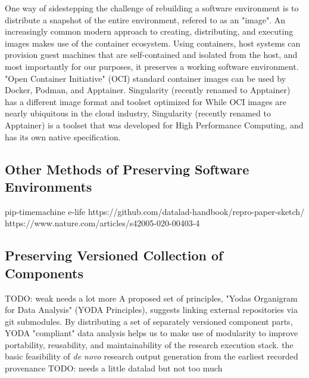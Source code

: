 One way of sidestepping the challenge of rebuilding a software environment is to distribute a snapshot of the entire environment, refered to as an "image".
An increasingly common modern approach to creating, distributing, and executing images makes use of the container ecosystem.
Using containers, host systems can provision guest machines that are self-contained and isolated from the host, and most importantly for our purposes, it preserves a working software environment.
"Open Container Initiative" (OCI) standard container images can be used by Docker, Podman, and Apptainer.
Singularity (recently renamed to Apptainer) has a different image format and toolset optimized for While OCI images are nearly ubiquitous in the cloud industry, Singularity (recently renamed to Apptainer) is a toolset that was developed for High Performance Computing, and has its own native specification.

\subsection{Other Methods of Preserving Software Environments}

pip-timemachine
e-life
https://github.com/datalad-handbook/repro-paper-sketch/
https://www.nature.com/articles/s42005-020-00403-4


\subsection{Preserving Versioned Collection of Components}

TODO: weak needs a lot more
A proposed set of principles, "Yodas Organigram for Data Analysis" (YODA Principles), suggests linking external repositories via git submodules. \cite{TODO YODA}
By distributing a set of separately versioned component parts, YODA "compliant" data analysis helps us to make use of modularity to improve portability, reusability, and maintainability of the research execution stack.
the basic feasibility of \textit{de novo} research output generation from the earliest recorded provenance
TODO: needs a little datalad but not too much

